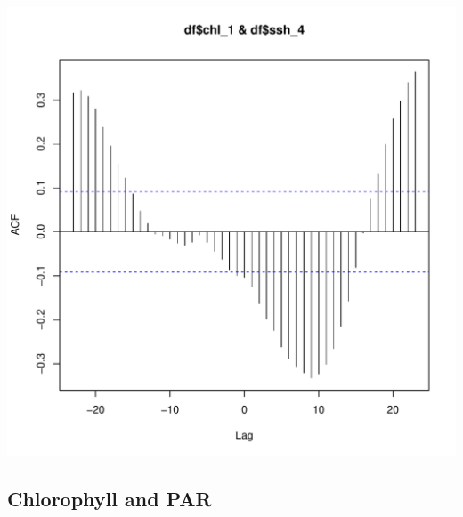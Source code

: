 \documentclass{article}\usepackage[]{graphicx}\usepackage[]{color}
\makeatletter
\def\maxwidth{ %
  \ifdim\Gin@nat@width>\linewidth
    \linewidth
  \else
    \Gin@nat@width
  \fi
}
\newenvironment{knitrout}{}{} %
\makeatother
\begin{document}
\begin{knitrout}
\includegraphics[width=\maxwidth]{figure/unnamed-chunk-14-2} 

\end{knitrout}

\subsection{Chlorophyll and PAR}
\end{document}
